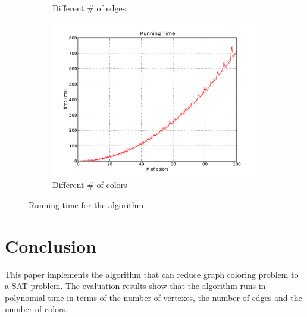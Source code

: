 \documentclass[11pt,letterpaper,oneside]{article}
\begin{document}
\begin{figure}
\begin{subfigure}[b]{0.3\textwidth}
    \caption{Different \# of edges}
    \label{fig:edge}
  \end{subfigure}%
  \begin{subfigure}[b]{0.3\textwidth}
    \centering
    \includegraphics[width=\textwidth]{fig3}
    \caption{Different \# of colors}
    \label{fig:color}
  \end{subfigure}
  \caption{Running time for the algorithm}\label{fig:evaluation}
\end{figure}


\section{Conclusion}
\label{sec:conclusion}
This paper implements the algorithm that can reduce graph coloring problem to a SAT problem. The evaluation results show that the algorithm runs in polynomial time in terms of the number of vertexes, the number of edges and the number of colors.



\end{document}
